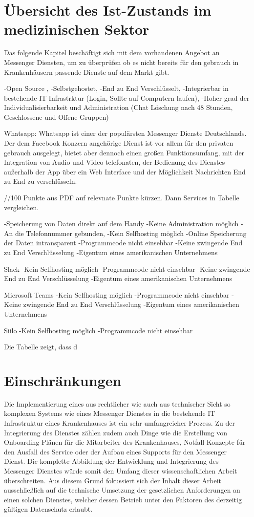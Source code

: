 \section{Übersicht des Ist-Zustands im medizinischen Sektor}\label{section:ueda}
Das folgende Kapitel beschäftigt sich mit dem vorhandenen Angebot an Messenger Diensten, um zu überprüfen ob es nicht bereits für den gebrauch in Krankenhäusern passende Dienste auf dem Markt gibt. 

-Open Source , -Selbstgehostet, -End zu End Verschlüsselt, -Integrierbar in bestehende IT Infrastrktur (Login, Sollte auf Computern laufen), -Hoher grad der Individualisierbarkeit und Administration (Chat Löschung nach 48 Stunden, Geschlossene und Offene Gruppen)

Whatsapp: Whatsapp ist einer der populärsten Messenger Dienste Deutschlands. Der dem Facebook Konzern angehörige Dienst ist vor allem für den privaten gebrauch ausgelegt, bietet aber dennoch einen großen Funktionsumfang, mit der Integration von Audio und Video telefonaten, der Bedienung des Dienstes außerhalb der App über ein Web Interface und der Möglichkeit Nachrichten End zu End zu verschlüsseln.

//100 Punkte aus PDF auf relevnate Punkte kürzen. Dann Services in Tabelle vergleichen.

-Speicherung von Daten direkt auf dem Handy 
-Keine Administration möglich 
-An die Telefonnummer gebunden,
-Kein Selfhosting möglich 
-Online Speicherung der Daten intransparent 
-Programmcode nicht einsehbar
-Keine zwingende End zu End Verschlüsselung
-Eigentum eines amerikanischen Unternehmens

Slack 
-Kein Selfhosting möglich 
-Programmcode nicht einsehbar
-Keine zwingende End zu End Verschlüsselung
-Eigentum eines amerikanischen Unternehmens

Microsoft Teams
-Kein Selfhosting möglich 
-Programmcode nicht einsehbar
-Keine zwingende End zu End Verschlüsselung
-Eigentum eines amerikanischen Unternehmens

Siilo 
-Kein Selfhosting möglich 
-Programmcode nicht einsehbar

Die Tabelle zeigt, dass d

\section{Einschränkungen}\label{section:einschraenkungen}
Die Implementierung eines aus rechtlicher wie auch aus technischer Sicht so komplexen Systems wie eines Messenger Dienstes in die bestehende IT Infrastruktur eines Krankenhauses ist ein sehr umfangreicher Prozess. Zu der Integrierung des Dienstes zählen zudem auch Dinge wie die Erstellung von Onboarding Plänen für die Mitarbeiter des Krankenhauses, Notfall Konzepte für den Ausfall des Service oder der Aufbau eines Supports für den Messenger Dienst. Die komplette Abbildung der Entwicklung und Integrierung des Messenger Dienstes würde somit den Umfang dieser wissenschaftlichen Arbeit überschreiten. Aus diesem Grund fokussiert sich der Inhalt dieser Arbeit ausschließlich auf die technische Umsetzung der gesetzlichen Anforderungen an einen solchen Dienstes, welcher dessen Betrieb unter den Faktoren des derzeitig gültigen Datenschutz erlaubt.


